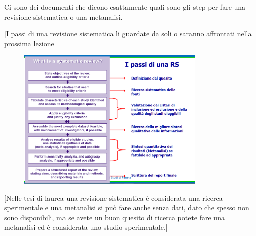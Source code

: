 Ci sono dei documenti che dicono esattamente quali sono gli step per
fare una revisione sistematica o una metanalisi.

{[}I passi di una revisione sistematica li guardate da soli o saranno
affrontati nella prossima lezione{]}

\begin{figure}[!ht]
\centering
	\includegraphics[width=0.8\textwidth]{04/image8.png}
	\end{figure}


{[}Nelle tesi di laurea una revisione sistematica è considerata una
ricerca sperimentale e una metanalisi si può fare anche senza dati, dato
che spesso non sono disponibili, ma se avete un buon quesito di ricerca
potete fare una metanalisi ed è considerata uno studio sperimentale.{]}

